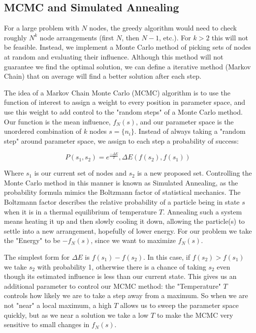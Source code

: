 \documentclass{article}
\begin{document}
	
	\subsection{MCMC and Simulated Annealing}
	For a large problem with $N$ nodes, the greedy algorithm would need to check roughly $N^k$ node arrangements (first $N$, then $N-1$, etc.). For $k > 2$ this will not be feasible. Instead, we implement a Monte Carlo method of picking sets of nodes at random and evaluating their influence. Although this method will not guarantee we find the optimal solution, we can define a iterative method (Markov Chain) that on average will find a better solution after each step.
		
	The idea of a Markov Chain Monte Carlo (MCMC) algorithm is to use the function of interest to assign a weight to every position in parameter space, and use this weight to add control to the "random steps" of a Monte Carlo method. Our function is the mean influence, $f_N(s)$, and our parameter space is the unordered combination of $k$ nodes $s = \{n_i\}$. Instead of always taking a "random step" around parameter space, we assign to each step a probability of success:
		
		\begin{equation}
		\boxed{
			P(s_1,s_2) = e^\frac{-\Delta E}{T}, \Delta E(f(s_2),f(s_1))
		}
		\end{equation}
		
		Where $s_1$ is our current set of nodes and $s_2$ is a new proposed set. Controlling the Monte Carlo method in this manner is known as Simulated Annealing, as the probability formula mimics the Boltzmann factor of statistical mechanics. The Boltzmann factor describes the relative probability of a particle being in state $s$ when it is in a thermal equilibrium of temperature $T$. Annealing such a system means heating it up and then slowly cooling it down, allowing the particle(s) to settle into a new arrangement, hopefully of lower energy. For our problem we take the "Energy" to be $-f_N(s)$, since we want to maximize $f_N(s)$. 
		
		The simplest form for $\Delta E$ is $f(s_1) - f(s_2)$. In this case, if $f(s_2) > f(s_1)$ we take $s_2$ with probability 1, otherwise there is a chance of taking $s_2$ even though its estimated influence is less than our current state. This gives us an additional parameter to control our MCMC method: the "Temperature" $T$ controls how likely we are to take a step away from a maximum. So when we are not "near" a local maximum, a high $T$ allows us to sweep the parameter space quickly, but as we near a solution we take a low $T$ to make the MCMC very sensitive to small changes in $f_N(s)$.
	
\end{document}
